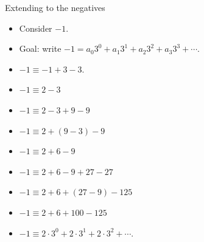\documentclass[8pt]{beamer}
\begin{document}
\begin{frame}{Extending to the negatives}

\begin{itemize}
\item Consider $-1$. \pause
\item Goal: write $-1 = a_0 3^0 + a_1 3^1 + a_2 3^2 + a_3 3^3 + \cdots$.
\item $-1 \equiv -1 + 3 - 3$. \pause
\item $-1 \equiv 2 - 3$ \pause
\item $-1 \equiv 2 - 3 + 9 - 9$ \pause
\item $-1 \equiv 2 + (9 - 3) - 9$ \pause
\item $-1 \equiv 2 + 6 - 9$ \pause
\item $-1 \equiv 2 + 6 - 9 + 27 - 27$ \pause
\item $-1 \equiv 2 + 6 + (27 - 9) - 125$ \pause
\item $-1 \equiv 2 + 6 + 100 - 125$ \pause
\item $-1 \equiv 2 \cdot 3^0 + 2 \cdot 3^1 + 2 \cdot 3^2 + \cdots$. \pause
\end{itemize}
\end{frame}
\end{document}
